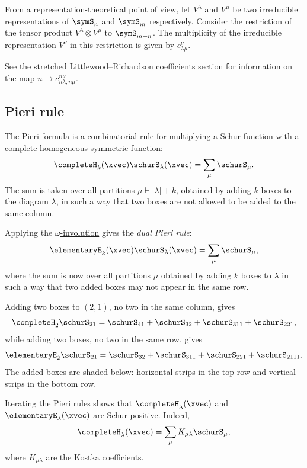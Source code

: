 From a representation-theoretical point of view, let $V^\lambda$ and $V^\mu$ be two irreducible representations
of $\symS_n$ and $\symS_m$ respectively.
Consider the restriction of the tensor product $V^\lambda \otimes V^\mu$ to $\symS_{m+n}$.
The multiplicity of the irreducible representation $V^\nu$ in this restriction is given by $c^{\nu}_{\lambda\mu}$.

See the \hyperref[lrStretched]{stretched Littlewood--Richardson coefficients}
section for information on the map $n \to c^{n \nu}_{n\lambda,n\mu}$.


\subsection[schurPieriRule]{Pieri rule}

The Pieri formula is a combinatorial rule for multiplying a Schur
function with a complete homogeneous symmetric function:
\[
\completeH_k(\xvec) \schurS_{\lambda}(\xvec) = \sum_{\mu} \schurS_{\mu}.
\]
The sum is taken over all partitions $\mu \vdash |\lambda|+k$, obtained by adding $k$ boxes to the diagram $\lambda$,
in such a way that two boxes are not allowed to be added to the same column.

Applying the \hyperref[standardInvolution]{$\omega$-involution} gives the
\emph{dual Pieri rule}:
\[
\elementaryE_k(\xvec) \schurS_{\lambda}(\xvec) = \sum_{\mu} \schurS_{\mu},
\]
where the sum is now over all partitions $\mu$ obtained by adding $k$ boxes to $\lambda$
in such a way that two added boxes may not appear in the same row.

\begin{example}
Adding two boxes to $(2,1)$, no two in the same column, gives
\[
\completeH_2\schurS_{21}=\schurS_{41}+\schurS_{32}+\schurS_{311}+\schurS_{221},
\]
while adding two boxes, no two in the same row, gives
\[
\elementaryE_2\schurS_{21}=\schurS_{32}+\schurS_{311}+\schurS_{221}+\schurS_{2111}.
\]
The added boxes are shaded below: horizontal strips in the top row and
vertical strips in the bottom row.
\begin{figure}
\end{figure}
\end{example}


Iterating the Pieri rules shows that $\completeH_\lambda(\xvec)$ and
$\elementaryE_\lambda(\xvec)$ are
\hyperref[schurPositiveDefinition]{Schur-positive}.  Indeed,
\[
\completeH_\lambda(\xvec) = \sum_{\mu} K_{\mu \lambda} \schurS_{\mu},
\]
where $K_{\mu \lambda}$ are the \hyperref[kostkaCoefficients]{Kostka coefficients}.


